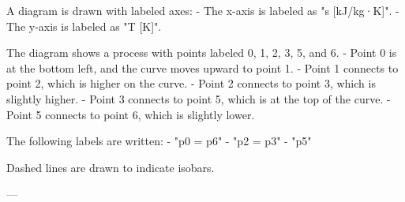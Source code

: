 A diagram is drawn with labeled axes:  
- The x-axis is labeled as "s [kJ/kg·K]".  
- The y-axis is labeled as "T [K]".  

The diagram shows a process with points labeled 0, 1, 2, 3, 5, and 6.  
- Point 0 is at the bottom left, and the curve moves upward to point 1.  
- Point 1 connects to point 2, which is higher on the curve.  
- Point 2 connects to point 3, which is slightly higher.  
- Point 3 connects to point 5, which is at the top of the curve.  
- Point 5 connects to point 6, which is slightly lower.  

The following labels are written:  
- "p0 = p6"  
- "p2 = p3"  
- "p5"  

Dashed lines are drawn to indicate isobars.  

---